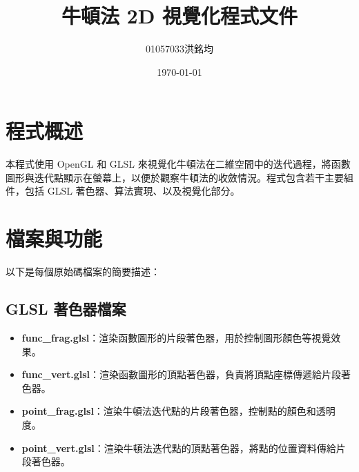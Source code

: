 \documentclass[a4paper,12pt]{article}
\title{牛頓法 2D 視覺化程式文件}
\author{01057033洪銘均}
\date{\today}
\begin{document}
\maketitle
\tableofcontents
\newpage

\section{程式概述}
本程式使用 OpenGL 和 GLSL 來視覺化牛頓法在二維空間中的迭代過程，將函數圖形與迭代點顯示在螢幕上，以便於觀察牛頓法的收斂情況。程式包含若干主要組件，包括 GLSL 著色器、算法實現、以及視覺化部分。

\section{檔案與功能}
以下是每個原始碼檔案的簡要描述：

\subsection{GLSL 著色器檔案}
\begin{itemize}
    \item \textbf{func\_frag.glsl}：渲染函數圖形的片段著色器，用於控制圖形顏色等視覺效果。
    \item \textbf{func\_vert.glsl}：渲染函數圖形的頂點著色器，負責將頂點座標傳遞給片段著色器。
    \item \textbf{point\_frag.glsl}：渲染牛頓法迭代點的片段著色器，控制點的顏色和透明度。
    \item \textbf{point\_vert.glsl}：渲染牛頓法迭代點的頂點著色器，將點的位置資料傳給片段著色器。
\end{itemize}
\end{document}
